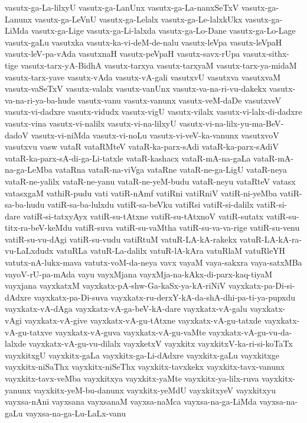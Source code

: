 {vasutx-ga-La-lilxyU
vasutx-ga-LanUnx
vasutx-ga-La-nanxSeTxV
vasutx-ga-Lanunx
vasutx-ga-LeVnU
vasutx-ga-Lelalx
vasutx-ga-Le-lalxkUkx
vasutx-ga-LiMda
vasutx-ga-Lige
vasutx-ga-Li-lalxda
vasutx-ga-Lo-Dane
vasutx-ga-Lo-Lage
vasutx-gaLu
vasutxka
vasutx-ka-vi-deM-de-nalu
vasutx-leVpa
vasutx-leVpaH
vasutx-leV-pa-vAda
vasutxnaH
vasutx-peVpaH
vasutx-savx-rUpa
vasutx-sithx-tige
vasutx-tarx-yA-BidhA
vasutx-tarxya
vasutx-tarxyaM
vasutx-tarx-ya-midaM
vasutx-tarx-yave
vasutx-vAda
vasutx-vA-gali
vasutxvU
vasutxva
vasutxvaM
vasutx-vaSeTxV
vasutx-valalx
vasutx-vanUnx
vasutx-va-na-ri-vu-dakekx
vasutx-va-na-ri-ya-ba-hude
vasutx-vanu
vasutx-vanunx
vasutx-veM-daDe
vasutxveV
vasutx-vi-dadxre
vasutx-vidudx
vasutx-vigU
vasutx-vilalx
vasutx-vi-lalx-di-dadxre
vasutx-vina
vasutx-vi-nalilx
vasutx-vi-na-lilxyU
vasutx-vi-na-lilx-yu-ma-BeV-dadoV
vasutx-vi-niMda
vasutx-vi-noLu
vasutx-vi-veV-ka-vanunx
vasutxvoV
vasutxvu
vasw
vataR
vataRMteV
vataR-ka-parx-sAdi
vataR-ka-parx-sAdiV
vataR-ka-parx-sA-di-ga-Li-tatxle
vataR-kashacx
vataR-mA-na-gaLa
vataR-mA-na-ga-LeMba
vataRna
vataR-na-viVga
vataRne
vataR-ne-ga-LigU
vataR-neya
vataR-ne-yalilx
vataR-ne-yanu
vataR-ne-yeM-budu
vataR-neyu
vataRteV
vatasx
vatasxgaM
vathiR-pudu
vati
vatiR-nAmf
vatiRni
vatiRniV
vatiR-ni-yeMba
vatiR-sa-ba-hudu
vatiR-sa-ba-lulxdu
vatiR-sa-beVku
vatiRsi
vatiR-si-dalilx
vatiR-si-dare
vatiR-si-tatxyAyx
vatiR-su-tAtxne
vatiR-su-tAtxnoV
vatiR-sutatx
vatiR-su-titx-ra-beV-keMdu
vatiR-suva
vatiR-su-vaMtha
vatiR-su-va-va-rige
vatiR-su-venu
vatiR-su-vu-dAgi
vatiR-su-vudu
vatiRtuM
vatuR-LA-kA-rakekx
vatuR-LA-kA-ra-vu-LaLxdudx
vatuRLa
vatuR-La-dalilx
vatuR-lA-kAra
vatuRlaM
vatuRleYH
vatutx-nA-lukx-mava
vatutx-voM-da-neya
vavx
vayaM
vaya-sakxra
vaya-satxMBa
vayoV-rU-pa-mAda
vayu
vayxMjana
vayxMja-na-kAkx-di-parx-kaq-tiyaM
vayxjana
vayxkatxM
vayxkatx-pA-shw-Ga-kaSx-ya-kA-riNiV
vayxkatx-pa-Di-si-dAdxre
vayxkatx-pa-Di-suva
vayxkatx-ru-derxY-kA-da-shA-dhi-pa-ti-ya-pupxdu
vayxkatx-vA-dAga
vayxkatx-vA-ga-beV-kA-dare
vayxkatx-vA-galu
vayxkatx-vAgi
vayxkatx-vA-give
vayxkatx-vA-gu-tAtxne
vayxkatx-vA-gu-tatxde
vayxkatx-vA-gu-tatxve
vayxkatx-vA-guva
vayxkatx-vA-gu-vaMte
vayxkatx-vA-gu-vu-da-lalxde
vayxkatx-vA-gu-vu-dilalx
vayxketxV
vayxkitx
vayxkitxV-ka-ri-si-koTaTx
vayxkitxgU
vayxkitx-gaLa
vayxkitx-ga-Li-dAdxre
vayxkitx-gaLu
vayxkitxge
vayxkitx-niSaThx
vayxkitx-niSeThx
vayxkitx-tavxkekx
vayxkitx-tavx-vanunx
vayxkitx-tavx-veMba
vayxkitxya
vayxkitx-yaMte
vayxkitx-ya-lilx-ruva
vayxkitx-yanunx
vayxkitx-yeM-bu-danunx
vayxkitx-yeMdU
vayxkitxyeV
vayxkitxyu
vayxsa-nAni
vayxsana
vayxsanaM
vayxsa-naMca
vayxsa-na-ga-LiMda
vayxsa-na-gaLu
vayxsa-na-ga-Lu-LaLx-vanu
}
